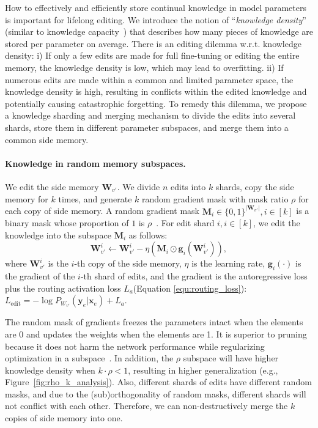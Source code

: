 \documentclass{article}
\begin{document}
How to effectively and efficiently store continual knowledge in model parameters is important for lifelong editing.
We introduce the notion of ``\textit{knowledge density}'' (similar to knowledge capacity~\cite{knowledge_capacity}) that describes how many pieces of knowledge are stored per parameter on average. There is an editing dilemma w.r.t. knowledge density: 
i) If only a few edits are made for full fine-tuning or editing the entire memory, the knowledge density is low, which may lead to overfitting.
ii) If numerous edits are made within a common and limited parameter space, the knowledge density is high, resulting in conflicts within the edited knowledge and potentially causing catastrophic forgetting.
To remedy this dilemma, we propose a knowledge sharding and merging mechanism to divide the edits into several shards, store them in different parameter subspaces, and merge them into a common side memory. 

\paragraph{Knowledge in random memory subspaces.} 
We edit the side memory $\mathbf{W}_{v'}$. 
We divide $n$ edits into $k$ shards, copy the side memory for $k$ times, and generate $k$ random gradient mask with mask ratio $\rho$ for each copy of side memory.
A random gradient mask $\mathbf{M}_i \in \{0, 1\}^{|\mathbf{W}_{v'}|}, i \in [k]$ is a binary mask whose proportion of $1$ is $\rho$~\cite{tna}. For edit shard $i, i \in [k]$, we edit the knowledge into the subspace $\mathbf{M}_i$ as follows:
\begin{equation} \label{equ:subspace_update}
    \mathbf{W}_{v'}^{i} \leftarrow \mathbf{W}_{v'}^{i}-\eta(\mathbf{M}_i\odot\mathbf{g}_i(\mathbf{W}_{v'}^{i})),
\end{equation}
where $\mathbf{W}_{v'}^{i}$ is the $i$-th copy of the side memory, $\eta$ is the learning rate, $\mathbf{g}_i(\cdot)$ is the gradient of the $i$-th shard of edits, and the gradient is the autoregressive loss plus the routing activation loss $L_a$(Equation \ref{equ:routing_loss}): $L_{\text{edit}} = -\log P_{W_{v'}}(\mathbf{y}_e | \mathbf{x}_e) + L_a$.

The random mask of gradients freezes the parameters intact when the elements are 0 and updates the weights when the elements are 1. 
It is superior to pruning because it does not harm the network performance while regularizing optimization in a subspace~\cite{tna}.
In addition, the $\rho$ subspace will have higher knowledge density when $k\cdot\rho < 1$, resulting in higher generalization (e.g., Figure~\ref{fig:rho_k_analysis}). Also, different shards of edits have different random masks, and due to the (sub)orthogonality of random masks, different shards will not conflict with each other. Therefore, we can non-destructively merge the $k$ copies of side memory into one.
\end{document}
